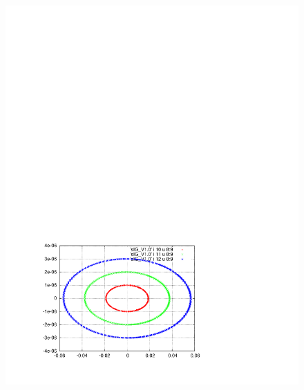 \documentclass[]{article}
\begin{document}
\begin{figure}[h]
\begin{minipage}[b]{0.45\linewidth}
\includegraphics[scale=0.6]{pdf/delta_vs_ct_V1p0.pdf}
\end{minipage}
%
%
\begin{minipage}[b]{0.45\linewidth}
\centering

\end{minipage}
\end{figure}
\end{document}
